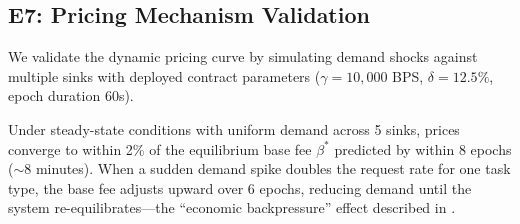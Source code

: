 \subsection{E7: Pricing Mechanism Validation}

We validate the dynamic pricing curve by simulating demand shocks against
multiple sinks with deployed contract parameters ($\gamma = 10{,}000$ BPS,
$\delta = 12.5\%$, epoch duration 60s).

Under steady-state conditions with uniform demand across 5 sinks, prices
converge to within 2\% of the equilibrium base fee $\beta^*$ predicted by
 within 8 epochs ($\sim$8 minutes). When a sudden demand
spike doubles the request rate for one task type, the base fee adjusts upward
over 6 epochs, reducing demand until the system re-equilibrates---the
``economic backpressure'' effect described in .
